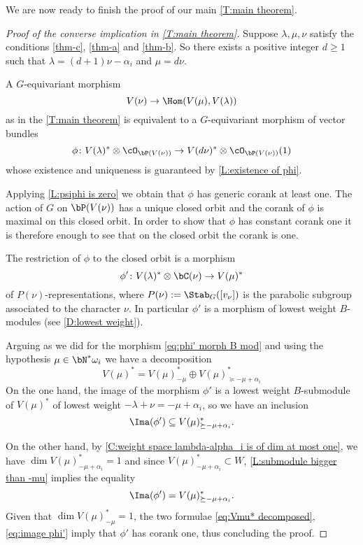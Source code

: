 \documentclass[reqno, 10pt]{amsart}
\theoremstyle{plain}
\theoremstyle{definition}
\numberwithin{equation}{section}%
\begin{document}
We are now ready to finish the proof of our main \cref{T:main theorem}.
\begin{proof}[Proof of the converse implication in \cref{T:main theorem}]
	Suppose $\lambda,\mu,\nu$ satisfy the conditions \ref{thm-c}, \ref{thm-a} 
        and \ref{thm-b}.
	So there exists a positive integer $d\ge 1$ such that $\lambda = (d+1)\nu-\alpha_{i}$ and $\mu = d\nu$.
	
	A $G$-equivariant morphism 
	\[V(\nu)\to \Hom(V(\mu),V(\lambda))\] 
	as in the \cref{T:main theorem} is equivalent to a $G$-equivariant morphism of vector bundles
	\[ \phi\colon V(\lambda)^*\otimes\cO_{\bP(V(\nu))}\to V(d\nu)^*\otimes \cO_{\bP(V(\nu))}(1) \]
	whose existence and uniqueness is guaranteed by 
	\cref{L:existence of phi}.
	
	Applying \cref{L:psiphi is zero} we obtain that $\phi$ has generic corank at least one.
	The action of $G$ on $\bP(V(\nu))$ has a unique closed orbit and the corank of $\phi$ is maximal on this closed orbit.
	In order to show that $\phi$ has constant corank one it is therefore enough to see that on the closed orbit the corank is one.
	
	The restriction of $\phi$ to the closed orbit is a morphism 
	\[ \phi'\colon V(\lambda)^*\otimes \bC(\nu)\to V(\mu)^* \]
	of $P(\nu)$-representations, where $P(\nu):=\Stab_G([v_\nu])$ is the parabolic subgroup associated to the character $\nu$.
	In particular $\phi'$ is a morphism of lowest weight $B$-modules (see \cref{D:lowest weight}).
	
	Arguing as we did for the morphism \eqref{eq:phi' morph B mod} and using the hypothesis $\mu\in\bN^*\omega_i$ we have a decomposition
	\begin{equation}\label{eq:Vmu* decomposed}
		V(\mu)^* = V(\mu)^*_{-\mu}\oplus V(\mu)^*_{\succeq-\mu+\alpha_i}
	\end{equation}
		On the one hand, the image of the morphism $\phi'$ is a lowest weight $B$-submodule of $V(\mu)^*$ of lowest weight $-\lambda+\nu = -\mu+\alpha_i$, so we have an inclusion
	\[ \Ima(\phi')\subseteq V(\mu)^*_{\succeq -\mu+\alpha_i}.\]
	
	On the other hand, by \cref{C:weight space lambda-alpha_i is of dim at most one}, we have $\dim V(\mu)^*_{-\mu+\alpha_i}=1$ and since $V(\mu)^*_{-\mu+\alpha_i}\subset W$, \cref{L:submodule bigger than -mu} implies the equality 
	\begin{equation}\label{eq:image phi'}
		\Ima(\phi') = V(\mu)^*_{\succeq-\mu+\alpha_i}.
	\end{equation}
	Given that $\dim V(\mu)^*_{-\mu}=1$, the two formulae \eqref{eq:Vmu* decomposed}, \eqref{eq:image phi'} imply that $\phi'$ has corank one, thus concluding the proof.
\end{proof}
\end{document}
